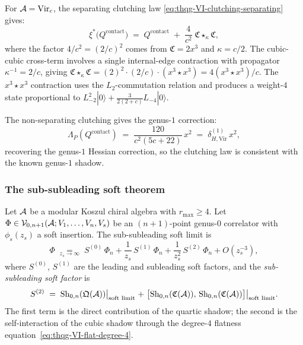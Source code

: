 \begin{computation}
\label{comp:thqg-VI-virasoro-clutching}
For $\mathcal{A} = \mathrm{Vir}_c$, the separating clutching law
\eqref{eq:thqg-VI-clutching-separating} gives:
\begin{equation}\label{eq:thqg-VI-virasoro-clutching-explicit}
\xi^*\bigl(Q^{\mathrm{contact}}\bigr)
\;=\;
Q^{\mathrm{contact}}
\;+\;
\frac{4}{c^2}\;\mathfrak{C} \star_\kappa \mathfrak{C},
\end{equation}
where the factor $4/c^2 = (2/c)^2$ comes from
$\mathfrak{C} = 2x^3$ and $\kappa = c/2$. The cubic-cubic
cross-term involves a single internal-edge contraction with
propagator $\kappa^{-1} = 2/c$, giving
$\mathfrak{C} \star_\kappa \mathfrak{C}
= (2)^2 \cdot (2/c) \cdot (x^3 \star x^3)
= 4(x^3 \star x^3)/c$.
The $x^3 \star x^3$ contraction uses the $L_2$-commutation relation
and produces a weight-$4$ state proportional to
$L_{-2}^2|0\rangle + \tfrac{3}{2(2+c)}L_{-4}|0\rangle$.

The non-separating clutching gives the genus-$1$ correction:
\begin{equation}\label{eq:thqg-VI-virasoro-nonsep-clutching}
\Lambda_P(Q^{\mathrm{contact}})
\;=\;
\frac{120}{c^2(5c + 22)}\,x^2
\;=\;
\delta_{H,\mathrm{Vir}}^{(1)}\,x^2,
\end{equation}
recovering the genus-$1$ Hessian correction, so the clutching law is consistent with the known genus-$1$
shadow.
\end{computation}

\subsubsection{The sub-subleading soft theorem}

\begin{theorem}
\label{thm:thqg-VI-sub-subleading-soft}
Let $\mathcal{A}$ be a modular Koszul chiral algebra with $r_{\max} \geq 4$.
Let $\Phi \in \mathcal{V}_{0,n+1}(\mathcal{A}; V_1, \dotsc, V_n, V_s)$ be an
$(n+1)$-point genus-$0$ correlator with $\phi_s(z_s)$ a soft
insertion. The sub-subleading soft limit is
\begin{equation}\label{eq:thqg-VI-sub-subleading}
\Phi
\;\underset{z_s \to \infty}{=}\;
S^{(0)}\,\Phi_n
+ \frac{1}{z_s}\,S^{(1)}\,\Phi_n
+ \frac{1}{z_s^2}\,S^{(2)}\,\Phi_n
+ O(z_s^{-3}),
\end{equation}
where $S^{(0)}$, $S^{(1)}$ are the leading and subleading soft
factors, and the \emph{sub-subleading soft factor} is
\begin{equation}\label{eq:thqg-VI-sub-subleading-factor}
S^{(2)}
\;=\;
\operatorname{Sh}_{0,n}(\mathfrak{Q}(\mathcal{A}))\bigl|_{\text{soft limit}}
\;+\;
\bigl[\operatorname{Sh}_{0,n}(\mathfrak{C}(\mathcal{A})),\,
\operatorname{Sh}_{0,n}(\mathfrak{C}(\mathcal{A}))\bigr]\bigl|_{\text{soft limit}}.
\end{equation}
The first term is the direct contribution of the quartic shadow;
the second is the self-interaction of the cubic shadow through the
degree-$4$ flatness equation~\eqref{eq:thqg-VI-flat-degree-4}.
\end{theorem}

